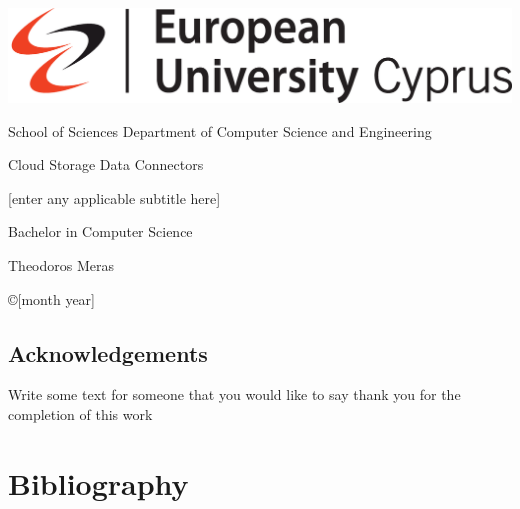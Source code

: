 \documentclass[12pt,a4paper]{report}
\begin{document}
    \thispagestyle{empty}
    {

    \noindent\includegraphics[scale=0.32]{images/euc}


        \begin{center}
            School of Sciences \textbar \; Department of Computer Science and Engineering
        \end{center}

        \vspace{1.5cm}
        \begin{center}
            \Huge  Cloud Storage Data Connectors
        \end{center}


        \vspace{0.2cm}
        \begin{center}
            \Large [enter any applicable subtitle here]
        \end{center}

        \vspace{1.5cm}
        \begin{center}
            \LARGE Bachelor in Computer Science
        \end{center}


        \vspace{1.5cm}
        \begin{center}
            \Large Theodoros Meras
        \end{center}
        \vspace{1.5cm}

        \noindent
        \begin{center}
            \copyright  [month year]
        \end{center}
        \newpage
        \thispagestyle{empty}

    }%

    \section*{Acknowledgements}
    Write some text for someone that you would like to say thank you for the completion of this work

    \newpage
    

    \newpage
    
    
    
    
    
    

    \chapter*{Bibliography}
    
    

    
    
\end{document}
